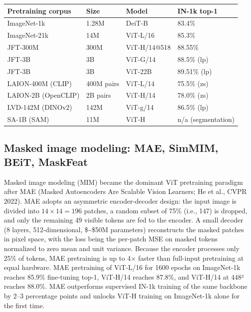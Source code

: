 {\def\LTcaptype{none} %
\begin{longtable}[]{@{}llll@{}}
\toprule\noalign{}
Pretraining corpus & Size & Model & IN-1k top-1 \\
\midrule\noalign{}
\endhead
\bottomrule\noalign{}
\endlastfoot
ImageNet-1k & 1.28M & DeiT-B & 83.4\% \\
ImageNet-21k & 14M & ViT-L/16 & 85.3\% \\
JFT-300M & 300M & ViT-H/14@518 & 88.55\% \\
JFT-3B & 3B & ViT-G/14 & 88.5\% (lp) \\
JFT-3B & 3B & ViT-22B & 89.51\% (lp) \\
LAION-400M (CLIP) & 400M pairs & ViT-L/14 & 75.5\% (zs) \\
LAION-2B (OpenCLIP) & 2B pairs & ViT-H/14 & 78.0\% (zs) \\
LVD-142M (DINOv2) & 142M & ViT-g/14 & 86.5\% (lp) \\
SA-1B (SAM) & 11M & ViT-H & n/a (segmentation) \\
\end{longtable}
}

\subsection{Masked image modeling: MAE, SimMIM, BEiT, MaskFeat}\label{masked-image-modeling-mae-simmim-beit-maskfeat}

Masked image modeling (MIM) became the dominant ViT pretraining paradigm after MAE (Masked Autoencoders Are Scalable Vision Learners; He et al., CVPR 2022). MAE adopts an asymmetric encoder-decoder design: the input image is divided into \(14 \times 14 = 196\) patches, a random subset of 75\% (i.e., 147) is dropped, and only the remaining 49 visible tokens are fed to the encoder. A small decoder (8 layers, 512-dimensional, \$\sim\$50M parameters) reconstructs the masked patches in pixel space, with the loss being the per-patch MSE on masked tokens normalized to zero mean and unit variance. Because the encoder processes only 25\% of tokens, MAE pretraining is up to 4× faster than full-input pretraining at equal hardware. MAE pretraining of ViT-L/16 for 1600 epochs on ImageNet-1k reaches 85.9\% fine-tuning top-1, ViT-H/14 reaches 87.8\%, and ViT-H/14 at 448² reaches 88.0\%. MAE outperforms supervised IN-1k training of the same backbone by 2--3 percentage points and unlocks ViT-H training on ImageNet-1k alone for the first time.

